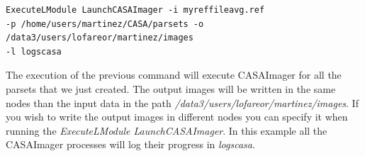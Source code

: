 \documentclass[a4paper,11pt]{article}
\begin{document}
\begin{verbatim}
ExecuteLModule LaunchCASAImager -i myreffileavg.ref 
-p /home/users/martinez/CASA/parsets -o /data3/users/lofareor/martinez/images
-l logscasa
\end{verbatim}

The execution of the previous command will execute CASAImager for all the parsets that we just created. The output images will be written in the same nodes than the input data in the path \textit{/data3/users/lofareor/martinez/images}. If you wish to write the output images in different nodes you can specify it when running the \textit{ExecuteLModule LaunchCASAImager}. In this example all the CASAImager processes will log their progress in \textit{logscasa}.
\end{document}
